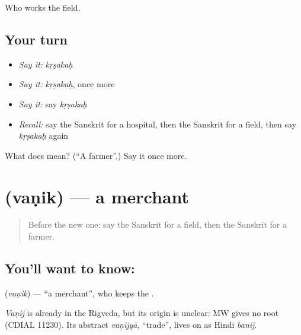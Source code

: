 \begin{grammarlens}[title={What you've built}]
Who works the field.
\end{grammarlens}

\subsection*{Your turn}
\begin{itemize}
\raggedright
  \item \emph{Say it:} \emph{kṛṣakaḥ}
  \item \emph{Say it:} \emph{kṛṣakaḥ}, once more
  \item \emph{Say it:} say \emph{kṛṣakaḥ}
  \item \emph{Recall:} say the Sanskrit for a hospital, then the Sanskrit for a field, then say \emph{kṛṣakaḥ} again
\end{itemize}

\begin{tcolorbox}[breakable,colback=teal!4,colframe=teal!35!black,title={Before you move on}]
What does  mean? (\textquotedblleft{}A farmer\textquotedblright{}.) Say it once more.
\end{tcolorbox}
\section[\texorpdfstring{\sk{वणिक्} (vaṇik)}{वणिक् (vaṇik)}]{ (vaṇik) — a merchant}

\label{lesson:SA-C84-merchant}



\begin{quote}
Before the new one: say the Sanskrit for a field, then the Sanskrit for a farmer.
\end{quote}

\subsection*{You'll want to know: }
\textbf{} (\emph{vaṇik}) — \textquotedblleft{}a merchant\textquotedblright{}, who keeps the \textbf{}.

\begin{cousinweb}
\emph{Vaṇij} is already in the Rigveda, but its origin is unclear: MW gives no root (CDIAL 11230). Its abstract \emph{vaṇijyā}, \textquotedblleft{}trade\textquotedblright{}, lives on as Hindi \emph{banij}.
\end{cousinweb}

